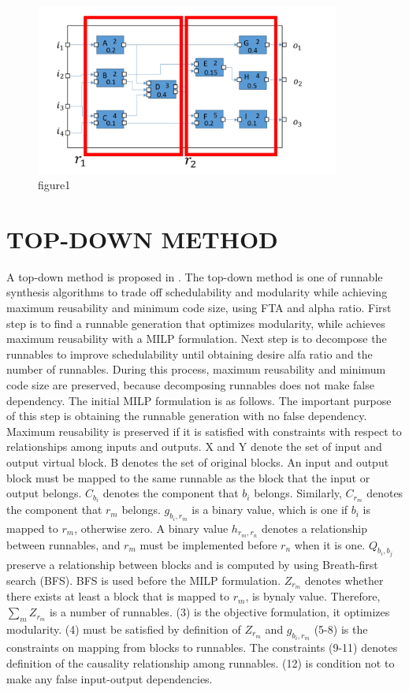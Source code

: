\documentclass[conference,compsoc]{IEEEtran}
\begin{document}
\begin{figure}
	\centering
	\includegraphics[width=10cm,clip]{figure2.pdf}
	\caption{figure1}
	\label{fig9}
\end{figure}


\section{TOP-DOWN METHOD}
 A top-down method is proposed in \cite{Deng:2015:MSF:2735960.2735972}.
The top-down method is one of runnable synthesis algorithms to trade off schedulability and modularity while achieving maximum reusability and minimum code size, using FTA and alpha ratio. 
First step is to find a runnable generation that optimizes modularity, while achieves maximum reusability with a MILP formulation.
Next step is to decompose the runnables to improve schedulability until obtaining desire alfa ratio and the number of runnables.
During this process, maximum reusability and minimum code size are preserved, because decomposing runnables does not make false dependency.
 The initial MILP formulation is as follows.
The important purpose of this step is obtaining the runnable generation with no false dependency.
Maximum reusability is preserved if it is satisfied with constraints with respect to relationships among inputs and outputs.
X and Y denote the set of input and output virtual block.
B denotes the set of original blocks.
An input and output block must be mapped to the same runnable as the block that the input or output belongs.
$C_{b_i}$ denotes the component that $b_i$ belongs.
Similarly, $C_{r_m}$ denotes the component that $r_m$ belongs.
$g_{b_i,r_m}$ is a binary value, which is one if $b_i$ is mapped to $r_m$, otherwise zero.
A binary value $h_{r_m,r_n}$ denotes a relationship between runnables, and $r_m$ must be implemented before $r_n$ when it is one.
$Q_{b_i,b_j}$ preserve a relationship between blocks and is computed by using Breath-first search (BFS).
BFS is used before the MILP formulation.
$Z_{r_m}$ denotes whether there exists at least a block that is mapped to $r_m$, is bynaly value.
Therefore, $\sum_m Z_{r_m}$ is a number of runnables.
(3) is the objective formulation, it optimizes modularity.
(4) must be satisfied by definition of $Z_{r_m}$ and $g_{b_i,r_m}$
(5-8) is the constraints on mapping from blocks to runnables.
The constraints (9-11) denotes definition of the causality relationship among runnables.
(12) is condition not to make any false input-output dependencies. 
\end{document}
